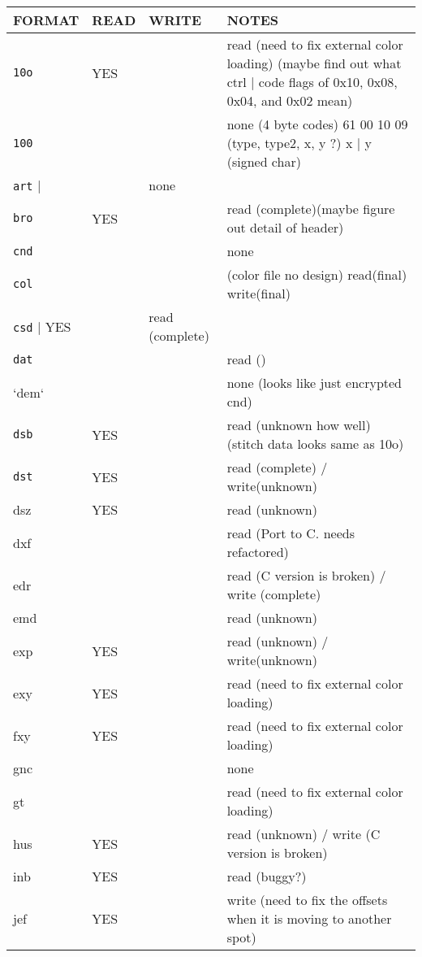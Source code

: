 \begin{longtable}{l l l p{8cm}}
\textbf{FORMAT} & \textbf{READ} & \textbf{WRITE} & \textbf{NOTES} \\
\hline
\index{10o}\texttt{10o} & YES &  & read (need to fix external color loading) (maybe find out what ctrl | code flags of 0x10, 0x08, 0x04, and 0x02 mean) \\
\index{100}\texttt{100} &  &  & none (4 byte codes) 61 00 10 09 (type, type2, x, y ?) x | y (signed char) \\
\index{art}\texttt{art} |  &  & none \\
\index{bro}\texttt{bro} & YES &  & read (complete)(maybe figure out detail of header) \\
\index{cnd}\texttt{cnd} &  &  & none \\
\index{col}\texttt{col} &  &  & (color file no design) read(final) write(final) \\
\index{csd}\texttt{csd} | YES   &  & read (complete) \\
\index{dat}\texttt{dat} &  &  & read () \\
\index{dem}`dem` &  &  & none (looks like just encrypted cnd) \\
\index{dsb}\texttt{dsb} & YES   &  & read (unknown how well) (stitch data looks same as 10o) \\
\index{dst}\texttt{dst} & YES   &  & read (complete) / write(unknown) \\
\index{dsz}dsz & YES   &  & read (unknown) \\
\index{dxf}dxf &  &  & read (Port to C. needs refactored) \\
\index{edr}edr &  &  & read (C version is broken) / write (complete) \\
\index{emd}emd &  &  & read (unknown) \\
\index{exp}exp & YES   &  & read (unknown) / write(unknown) \\
\index{exy}exy & YES   &  & read (need to fix external color loading) \\
\index{fxy}fxy & YES   &  & read (need to fix external color loading) \\
\index{gnc}gnc &  &  & none \\
\index{gt}gt &  &  & read (need to fix external color loading) \\
\index{hus}hus & YES   &  & read (unknown) / write (C version is broken) \\
\index{inb}inb & YES   &  & read (buggy?) \\
\index{jef}jef & YES   &  & write (need to fix the offsets when it is moving to another spot) \\

\end{longtable}
